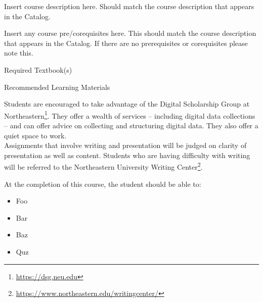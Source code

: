 \documentclass{neu_syllabus}
\date{Fall 2018}
\begin{document}
\begin{SyllabusHeader}
\instructor
{}
\end{SyllabusHeader}

Insert course description here.
Should match the course description that appears in the Catalog.

Insert any course pre/corequisites here.
This should match the course description that appears in the Catalog.
If there are no prerequisites or corequisites please note this.

\begin{SyllabusBooks}{Required Textbook(s)}
\end{SyllabusBooks}

\begin{SyllabusBooks}{Recommended Learning Materials}
\end{SyllabusBooks}

\newpage


Students are encouraged to take advantage of the Digital Scholarship Group at Northeastern\footnote{\url{https://dsg.neu.edu}}.
They offer a wealth of services -- including digital data collections -- and can offer advice on collecting and structuring digital data.
They also offer a quiet space to work.
\\

Assignments that involve writing and presentation will be judged on clarity of presentation as well as content.
Students who are having difficulty with writing will be referred to the Northeastern University Writing Center\footnote{\url{https://www.northeastern.edu/writingcenter/}}.


At the completion of this course, the student should be able to:
\begin{itemize}
\item Foo
\item Bar
\item Baz
\item Quz
\end{itemize}
\end{document}
